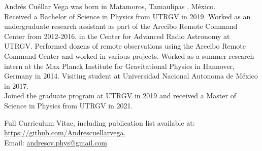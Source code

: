 \noindent
Andr\'{e}s Cu\'{e}llar Vega was born in Matamoros, Tamaulipas , M\'{e}xico.\\
Received a Bachelor of Science in Physics from UTRGV in 2019.
Worked as an undergraduate research assistant as part of the Arecibo Remote Command Center from 2012-2016, in the Center for Advanced Radio Astronomy at UTRGV. Performed dozens of remote observations using the Arecibo Remote Command Center and worked in various projects.
Worked as a summer research intern at the Max Planck Institute for Gravitational Physics in Hannover, Germany in 2014. Visiting student at Universidad Nacional Autonoma de M\'{e}xico in 2017.\\
Joined the graduate program at UTRGV in 2019 and received a Master of Science in Physics from UTRGV in 2021.


\noindent
Full Curriculum Vitae, including publication list available at:\\ \href{https://github.com/Andrescuellarvega}{https://github.com/Andrescuellarvega.}\\
Email: \href{mailto:andrescv.phys@gmail.com}{andrescv.phys@gmail.com}
